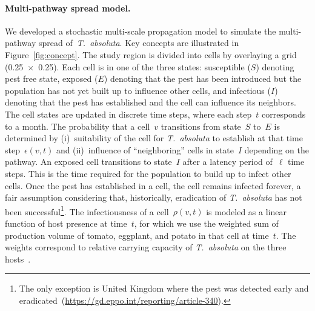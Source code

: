 \documentclass[11pt]{article}
\newcommand{\tuta}{\emph{T.~absoluta}}
\newcommand{\infest}{\rho}
\newcommand{\suitable}{\epsilon}
\theoremstyle{definition}
\begin{document}
\paragraph{Multi-pathway spread model.} We developed a stochastic
multi-scale propagation model to simulate the multi-pathway spread
of~\tuta{}. Key concepts are illustrated in Figure~\ref{fig:concept}. The
study region is divided into cells by overlaying a grid
(0.25\textdegree~$\times$~0.25\textdegree). Each cell is in one of the
three states: susceptible ($S$) denoting pest free state, exposed ($E$)
denoting that the pest has been introduced but the population has not yet
built up to influence other cells, and infectious ($I$) denoting that the
pest has established and the cell can influence its neighbors. The cell
states are updated in discrete time steps, where each step~$t$ corresponds
to a month.  The probability that a cell~$v$ transitions from state~$S$
to~$E$ is determined by (i)~suitability of the cell for \tuta{} to
establish at that time step~$\suitable(v,t)$ and (ii)~influence of
``neighboring'' cells in state~$I$ depending on the pathway. An exposed
cell transitions to state~$I$ after a latency period of~$\ell$ time steps.
This is the time required for the population to build up to infect other
cells.  Once the pest has established in a cell, the cell remains infected
forever, a fair assumption considering that, historically, eradication of
\tuta{} has not been successful\footnote{The only exception is United
Kingdom where the pest was detected early and
eradicated~(\url{https://gd.eppo.int/reporting/article-340}).}.  The
infectiousness of a cell~$\infest(v,t)$ is modeled as a linear function of
host presence at time~$t$, for which we use the weighted sum of production
volume of tomato, eggplant, and potato in that cell at time~$t$. The
weights correspond to relative carrying capacity of \tuta{} on the three
hosts~\cite{sylla2018}.
\end{document}
